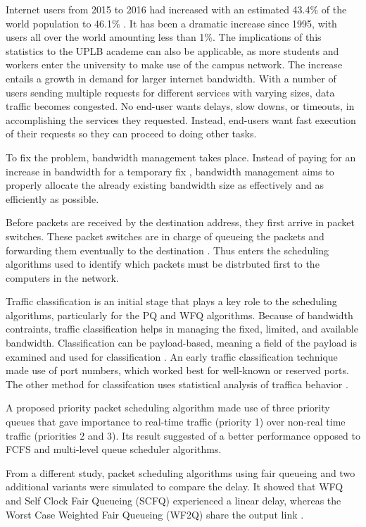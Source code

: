 \documentclass[journal]{IEEE/IEEEtran}
\begin{document}
Internet users from 2015 to 2016 had increased with an estimated 43.4\% of the world population to 46.1\% \cite{internet_live_stats_2016}. It has been a dramatic increase since 1995, with users all over the world amounting less than 1\%. The implications of this statistics to the UPLB academe can also be applicable, as more students and workers enter the university to make use of the campus network. The increase entails a growth in demand for larger internet bandwidth. With a number of users sending multiple requests for different services with varying sizes, data traffic becomes congested. No end-user wants delays, slow downs, or timeouts, in accomplishing the services they requested. Instead, end-users want fast execution of their requests so they can proceed to doing other tasks.

To fix the problem, bandwidth management takes place. Instead of paying for an increase in bandwidth for a temporary fix \cite{communication_news_2001}, bandwidth management aims to properly allocate the already existing bandwidth size as effectively and as efficiently as possible.

Before packets are received by the destination address, they first arrive in packet switches. These packet switches are in charge of queueing the packets and forwarding them eventually to the destination \cite{comer_1999}. Thus enters the scheduling algorithms used to identify which packets must be distrbuted first to the computers in the network.

Traffic classification is an initial stage that plays a key role to the scheduling algorithms, particularly for the PQ and WFQ algorithms. Because of bandwidth contraints, traffic classification helps in managing the fixed, limited, and available bandwidth. Classification can be payload-based, meaning a field of the payload is examined and used for classification \cite[Chapter~5]{cisco_2008}. An early traffic classification technique \cite{schneider_1996} made use of port numbers, which worked best for well-known or reserved ports. The other method for classifcation uses statistical analysis of traffica behavior \cite[Chapter~5]{cisco_2008}.

A proposed priority packet scheduling algorithm \cite{karim_2012} made use of three priority queues that gave importance to real-time traffic (priority 1) over non-real time traffic (priorities 2 and 3). Its result suggested of a better performance opposed to FCFS and multi-level queue scheduler algorithms.

From a different study, packet scheduling algorithms using fair queueing and two additional variants were simulated to compare the delay. It showed that WFQ and Self Clock Fair Queueing (SCFQ) experienced a linear delay, whereas the Worst Case Weighted Fair Queueing (WF2Q) share the output link \cite{muhilan_2013}.
\end{document}
